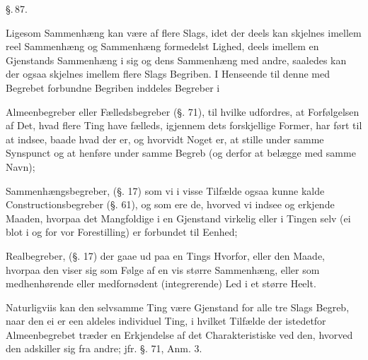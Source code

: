 \documentclass[12pt]{book}
\def\textit#1{#1}%
\def\emph#1{#1}%
\newcommand{\parag}[1]{%
  \par\vspace{0.9\baselineskip}%
  {\centering\textit{\S.\,#1.}\par}%
  \vspace{0.35\baselineskip}%
  \noindent\hspace{\parindent}\ignorespaces
}
\newcommand{\opage}[1]{\marginnote{\footnotesize\textit{[#1]}}}
\begin{document}
\opage{229} \parag{87}

Ligesom Sammenhæng kan være af flere Slags, idet der deels kan skjelnes imellem reel
Sammenhæng og Sammenhæng formedelst Lighed, deels imellem en Gjenstands Sammenhæng i
sig og dens Sammenhæng med andre, saaledes kan der ogsaa skjelnes imellem flere Slags
Begriben. I Henseende til denne med Begrebet forbundne Begriben inddeles Begreber i

\emph{Almeenbegreber} eller \emph{Fælledsbegreber} (§. 71), til hvilke udfordres, at
Forfølgelsen af Det, hvad flere Ting have fælleds, igjennem dets forskjellige Former,
har ført til at indsee, baade hvad der er, og hvorvidt Noget er, at stille under samme
Synspunct og at henføre under samme Begreb (og derfor at belægge med samme Navn);

\emph{Sammenhængsbegreber}, (§. 17) som vi i visse Tilfælde ogsaa kunne kalde
\emph{Constructionsbegreber} (§. 61), og som ere de, hvorved vi indsee og erkjende
Maaden, hvorpaa det Mangfoldige i en Gjenstand virkelig eller i Tingen selv (ei blot i
og for vor Forestilling) er forbundet til Eenhed;

\emph{Realbegreber}, (§. 17) der gaae ud paa en Tings Hvorfor, eller den Maade, hvorpaa
den viser sig som Følge af en vis større Sammenhæng, eller som medhenhørende eller
medfornødent (integrerende) Led i et større Heelt.

\opage{230} Naturligviis kan den selvsamme Ting være Gjenstand for alle tre Slags Begreb, naar den
ei er een aldeles individuel Ting, i hvilket Tilfælde der istedetfor Almeenbegrebet
træder en Erkjendelse af det Charakteristiske ved den, hvorved den adskiller sig fra
andre; jfr. §. 71, Anm. 3.
\end{document}

